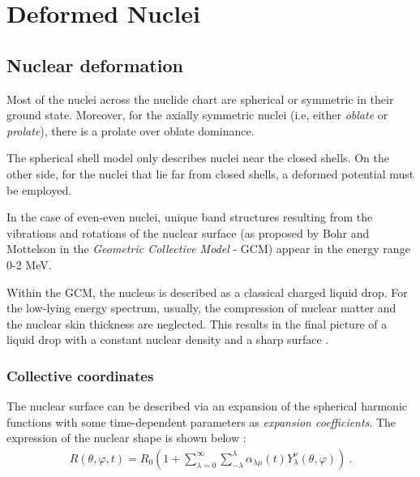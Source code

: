 \chapter{Deformed Nuclei}

\section{Nuclear deformation}

Most of the nuclei across the nuclide chart are spherical or symmetric in their ground state. Moreover, for the axially symmetric nuclei (i.e, either \emph{oblate} or \emph{prolate}), there is a prolate over oblate dominance.

The spherical shell model only describes nuclei near the closed shells. On the other side, for the nuclei that lie far from closed shells, a deformed potential must be employed. 
\par In the case of even-even nuclei, unique band structures resulting from the vibrations and rotations of the nuclear surface (as proposed by Bohr and Mottelson \cite{bohr1998nuclear} in the \emph{Geometric Collective Model} - GCM) appear in the energy range 0-2 MeV.

Within the GCM, the nucleus is described as a classical charged liquid drop. For the low-lying energy spectrum, usually, the compression of nuclear matter and the nuclear skin thickness are neglected. This results in the final picture of a liquid drop with a constant nuclear density and a sharp surface \cite{greiner1996nuclear}.

\subsection{Collective coordinates}

The nuclear surface can be described via an expansion of the spherical harmonic functions with some time-dependent parameters as \emph{expansion coefficients}. The expression of the nuclear shape is shown below \cite{greiner1996nuclear}:
\begin{align}
    R(\theta,\varphi,t)=R_0\left(1+\sum_{\lambda=0}^\infty\sum_{-\lambda}^\lambda\alpha_{\lambda\mu}(t)Y_\lambda^\nu(\theta,\varphi)\right)\ .
    \label{nuclear-shape}
\end{align}

